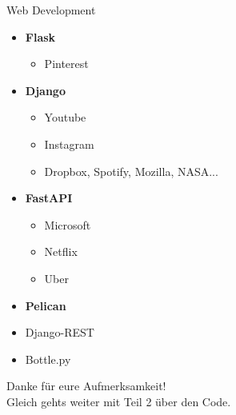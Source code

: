 \documentclass{beamer}
\begin{document}
\begin{frame}
\begin{center}
\begin{block}{Web Development}
\begin{itemize}
\item \textbf{Flask}
\begin{itemize}
\item Pinterest
\end{itemize}
\item \textbf{Django}
\begin{itemize}
\item Youtube
\item Instagram
\item Dropbox, Spotify, Mozilla, NASA...
\end{itemize}
\item \textbf{FastAPI}
\begin{itemize}
\item Microsoft
\item Netflix
\item Uber
\end{itemize}
\item \textbf{Pelican}
\item Django-REST
\item Bottle.py
\end{itemize}
\end{block}
\end{center}
\end{frame}

\begin{frame}
\begin{center}
{ \Huge Danke f\"ur eure Aufmerksamkeit!}\\
Gleich gehts weiter mit Teil 2 über den Code.
\end{center}
\end{frame}
\end{document}
